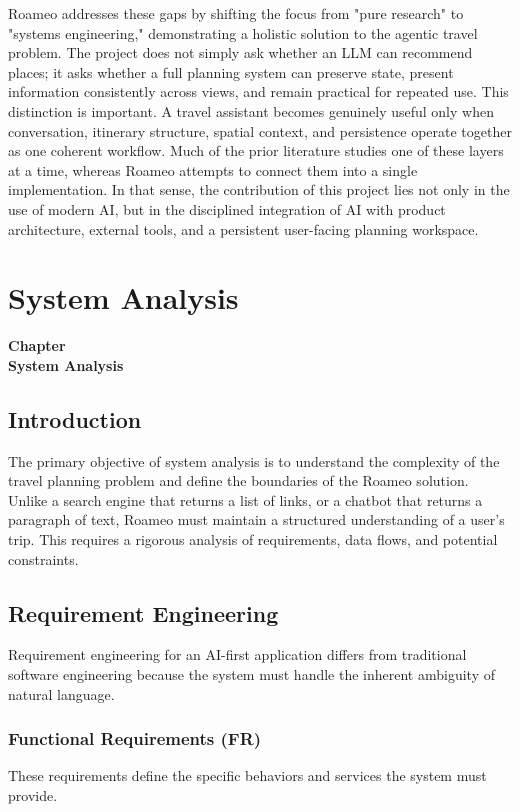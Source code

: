 \documentclass[12pt,a4paper]{report}
\newcommand{\chaptercontentheading}[1]{%
  \thispagestyle{mainstyle}%
  \begin{center}
    {\Large\bfseries Chapter~\thechapter}\\[0.35cm]
    {\Large\bfseries #1}
  \end{center}
  \vspace{0.9cm}
}
\begin{document}
Roameo addresses these gaps by shifting the focus from "pure research" to "systems engineering," demonstrating a holistic solution to the agentic travel problem. The project does not simply ask whether an LLM can recommend places; it asks whether a full planning system can preserve state, present information consistently across views, and remain practical for repeated use.
This distinction is important. A travel assistant becomes genuinely useful only when conversation, itinerary structure, spatial context, and persistence operate together as one coherent workflow. Much of the prior literature studies one of these layers at a time, whereas Roameo attempts to connect them into a single implementation. In that sense, the contribution of this project lies not only in the use of modern AI, but in the disciplined integration of AI with product architecture, external tools, and a persistent user-facing planning workspace.



\chapter{System Analysis}
\chaptercontentheading{System Analysis}

\section{Introduction}

The primary objective of system analysis is to understand the complexity of the travel planning problem and define the boundaries of the Roameo solution. Unlike a search engine that returns a list of links, or a chatbot that returns a paragraph of text, Roameo must maintain a structured understanding of a user's trip. This requires a rigorous analysis of requirements, data flows, and potential constraints.

\section{Requirement Engineering}

Requirement engineering for an AI-first application differs from traditional software engineering because the system must handle the inherent ambiguity of natural language.

\subsection{Functional Requirements (FR)}
These requirements define the specific behaviors and services the system must provide.
\end{document}
